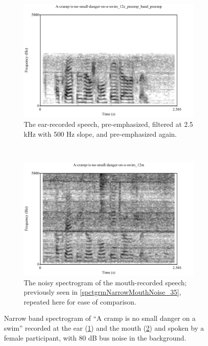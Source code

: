 \begin{figure}[H]
\centering
\begin{subfigure}{\textwidth}
  \centering
  \includegraphics[width=0.9\linewidth]{figure/spctgrmNarrowEarNoisePrempFiltPremp.pdf}
  \caption{The ear-recorded speech, pre-emphasized, filtered at 2.5 kHz with 500 Hz slope, and pre-emphasized again.}
  \label{spctgrmNarrowEarNoisePrempFiltPremp_35}
\end{subfigure}%
\\[2ex]
\begin{subfigure}{\textwidth}
  \centering
  \includegraphics[width=0.9\linewidth]{figure/spctgrmNarrowMthNoise_35.pdf}
  \caption{The noisy spectrogram of the mouth-recorded speech; previously seen in \ref{spctgrmNarrowMouthNoise_35}, repeated here for ease of comparison.}
  \label{spctgrmNarrowMouthNoise_35_compare}
\end{subfigure}
\caption{Narrow band spectrogram of ``A cramp is no small danger on a swim'' recorded at the ear (\ref{spctgrmNarrowEarNoisePrempFiltPremp_35}) and the mouth (\ref{spctgrmNarrowMouthNoise_35_compare}) and spoken by a female participant, with 80 dB bus noise in the background.}
\label{fig:ear_pfp}
\end{figure}

